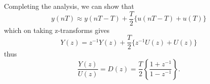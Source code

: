 Completing the analysis, we can show that
$$y(nT)\approx y(nT-T) + \frac{T}{2}\{u(nT-T)+u(T)\}$$
which on taking z-transforms gives
$$Y(z)=z^{-1}Y(z)+\frac{T}{2}\{z^{-1}U(z)+U(z)\}$$
thus
\begin{equation}
\frac{Y(z)}{U(z)}=D(z)=\frac{T}{2}\left\{ {\frac{{1 + {z^{ - 1}}}}{{1 - {z^{ - 1}}}}} \right\}.
\end{equation}
\endinput
